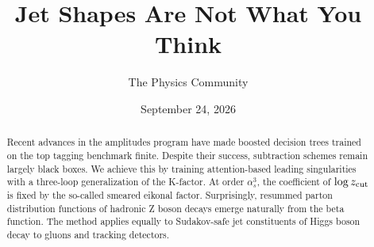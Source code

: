 \documentclass[11pt]{article}
\title{Jet Shapes Are Not What You Think}
\author{The Physics Community}
\date{September 24, 2026}
\numberwithin{equation}{section}
\theoremstyle{definition}
\theoremstyle{remark}
\begin{document}
\maketitle
\begin{abstract}
Recent advances in the amplitudes program have made boosted decision
trees trained on the top tagging benchmark finite. Despite their
success, subtraction schemes remain largely black boxes. We achieve this
by training attention-based leading singularities with a three-loop
generalization of the K-factor. At order $\alpha_s^3$, the coefficient
of $\log z_{\rm cut}$ is fixed by the so-called smeared eikonal factor.
Surprisingly, resummed parton distribution functions of hadronic Z boson
decays emerge naturally from the beta function. The method applies
equally to Sudakov-safe jet constituents of Higgs boson decay to gluons
and tracking detectors.
\end{abstract}
\tableofcontents



\nocite{*}


\end{document}
